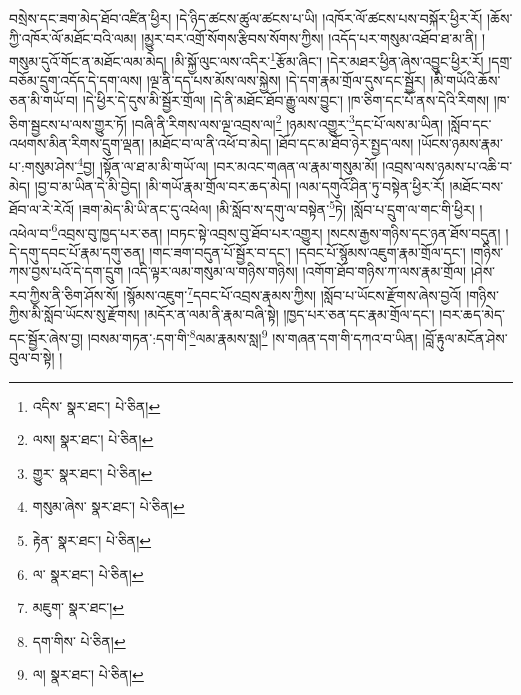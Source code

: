 བསྲེས་དང་ཟག་མེད་ཐོབ་འཛིན་ཕྱིར། །དེ་ཉིད་ཚངས་ཚུལ་ཚངས་པ་ཡི། །འཁོར་ལོ་ཚངས་པས་བསྐོར་ཕྱིར་རོ། །ཆོས་ཀྱི་འཁོར་ལོ་མཐོང་བའི་ལམ། །མྱུར་བར་འགྲོ་སོགས་རྩིབས་སོགས་ཀྱིས། །འདོད་པར་གསུམ་འཐོབ་ཐ་མ་ནི། །གསུམ་དུའོ་གོང་ན་མཐོང་ལམ་མེད། །མི་སྐྱོ་ལུང་ལས་འདིར་\footnote{འདིས་  སྣར་ཐང་།  པེ་ཅིན། }རྩོམ་ཞིང་། །དེར་མཐར་ཕྱིན་ཞེས་འབྱུང་ཕྱིར་རོ། །དགྲ་བཅོམ་དྲུག་འདོད་དེ་དག་ལས། །ལྔ་ནི་དད་པས་མོས་ལས་སྐྱེས། །དེ་དག་རྣམ་གྲོལ་དུས་དང་སྦྱོར། །མི་གཡོའི་ཆོས་ཅན་མི་གཡོ་བ། །དེ་ཕྱིར་དེ་དུས་མི་སྦྱོར་གྲོལ། །དེ་ནི་མཐོང་ཐོབ་རྒྱུ་ལས་བྱུང་། །ཁ་ཅིག་དང་པོ་ནས་དེའི་རིགས། །ཁ་ཅིག་སྦྱངས་པ་ལས་གྱུར་ཏོ། །བཞི་ནི་རིགས་ལས་ལྔ་འབྲས་ལ།\footnote{ལས།  སྣར་ཐང་།  པེ་ཅིན། } །ཉམས་འགྱུར་\footnote{གྱུར་  སྣར་ཐང་།  པེ་ཅིན། }དང་པོ་ལས་མ་ཡིན། །སློབ་དང་འཕགས་མིན་རིགས་དྲུག་ལྡན། །མཐོང་བ་ལ་ནི་འཕོ་བ་མེད། །ཐོབ་དང་མ་ཐོབ་ཉེར་སྤྱད་ལས། །ཡོངས་ཉམས་རྣམ་པ་:གསུམ་ཤེས་\footnote{གསུམ་ཞེས་  སྣར་ཐང་།  པེ་ཅིན། }བྱ། །སྟོན་ལ་ཐ་མ་མི་གཡོ་ལ། །བར་མའང་གཞན་ལ་རྣམ་གསུམ་མོ། །འབྲས་ལས་ཉམས་པ་འཆི་བ་མེད། །བྱ་བ་མ་ཡིན་དེ་མི་བྱེད། །མི་གཡོ་རྣམ་གྲོལ་བར་ཆད་མེད། །ལམ་དགུའོ་ཤིན་ཏུ་བསྟེན་ཕྱིར་རོ། །མཐོང་བས་ཐོབ་ལ་རེ་རེའོ། །ཟག་མེད་མི་ཡི་ནང་དུ་འཕེལ། །མི་སློབ་ས་དགུ་ལ་བསྟེན་\footnote{རྟེན་  སྣར་ཐང་།  པེ་ཅིན། }ཏེ། །སློབ་པ་དྲུག་ལ་གང་གི་ཕྱིར། །འཕེལ་བ་\footnote{ལ་  སྣར་ཐང་།  པེ་ཅིན། }འབྲས་བུ་ཁྱད་པར་ཅན། །བཏང་སྟེ་འབྲས་བུ་ཐོབ་པར་འགྱུར། །སངས་རྒྱས་གཉིས་དང་ཉན་ཐོས་བདུན། །དེ་དགུ་དབང་པོ་རྣམ་དགུ་ཅན། །གང་ཟག་བདུན་པོ་སྦྱོར་བ་དང་། །དབང་པོ་སྙོམས་འཇུག་རྣམ་གྲོལ་དང་། །གཉིས་ཀས་བྱས་པའོ་དེ་དག་དྲུག །འདི་ལྟར་ལམ་གསུམ་ལ་གཉིས་གཉིས། །འགོག་ཐོབ་གཉིས་ཀ་ལས་རྣམ་གྲོལ། །ཤེས་རབ་ཀྱིས་ནི་ཅིག་ཤོས་སོ། །སྙོམས་འཇུག་\footnote{མཇུག་  སྣར་ཐང་། }དབང་པོ་འབྲས་རྣམས་ཀྱིས། །སློབ་པ་ཡོངས་རྫོགས་ཞེས་བྱའོ། །གཉིས་ཀྱིས་མི་སློབ་ཡོངས་སུ་རྫོགས། །མདོར་ན་ལམ་ནི་རྣམ་བཞི་སྟེ། །ཁྱད་པར་ཅན་དང་རྣམ་གྲོལ་དང་། །བར་ཆད་མེད་དང་སྦྱོར་ཞེས་བྱ། །བསམ་གཏན་:དག་གི་\footnote{དག་གིས་  པེ་ཅིན། }ལམ་རྣམས་སླ།\footnote{ལ།  སྣར་ཐང་།  པེ་ཅིན། } །ས་གཞན་དག་གི་དཀའ་བ་ཡིན། །བློ་རྟུལ་མངོན་ཤེས་བུལ་བ་སྟེ། །
